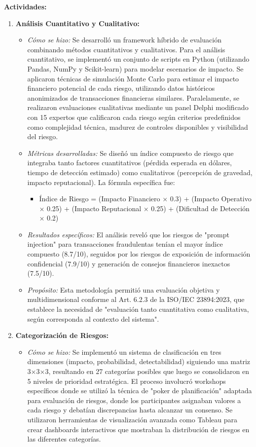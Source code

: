 \documentclass[12pt]{article}
\begin{document}
\textbf{Actividades:}
\begin{enumerate}
    \item \textbf{Análisis Cuantitativo y Cualitativo:}
        \begin{itemize}
            \item \textit{Cómo se hizo:} Se desarrolló un framework híbrido de evaluación combinando métodos cuantitativos y cualitativos. Para el análisis cuantitativo, se implementó un conjunto de scripts en Python (utilizando Pandas, NumPy y Scikit-learn) para modelar escenarios de impacto. Se aplicaron técnicas de simulación Monte Carlo para estimar el impacto financiero potencial de cada riesgo, utilizando datos históricos anonimizados de transacciones financieras similares. Paralelamente, se realizaron evaluaciones cualitativas mediante un panel Delphi modificado con 15 expertos que calificaron cada riesgo según criterios predefinidos como complejidad técnica, madurez de controles disponibles y visibilidad del riesgo.
            \item \textit{Métricas desarrolladas:} Se diseñó un índice compuesto de riesgo que integraba tanto factores cuantitativos (pérdida esperada en dólares, tiempo de detección estimado) como cualitativos (percepción de gravedad, impacto reputacional). La fórmula específica fue:
              \begin{itemize}
                \item Índice de Riesgo = (Impacto Financiero × 0.3) + (Impacto Operativo × 0.25) + (Impacto Reputacional × 0.25) + (Dificultad de Detección × 0.2)
              \end{itemize}
            \item \textit{Resultados específicos:} El análisis reveló que los riesgos de "prompt injection" para transacciones fraudulentas tenían el mayor índice compuesto (8.7/10), seguidos por los riesgos de exposición de información confidencial (7.9/10) y generación de consejos financieros inexactos (7.5/10).
            \item \textit{Propósito:} Esta metodología permitió una evaluación objetiva y multidimensional conforme al Art. 6.2.3 de la ISO/IEC 23894:2023, que establece la necesidad de "evaluación tanto cuantitativa como cualitativa, según corresponda al contexto del sistema".
        \end{itemize}
    \item \textbf{Categorización de Riesgos:}
        \begin{itemize}
            \item \textit{Cómo se hizo:} Se implementó un sistema de clasificación en tres dimensiones (impacto, probabilidad, detectabilidad) siguiendo una matriz 3×3×3, resultando en 27 categorías posibles que luego se consolidaron en 5 niveles de prioridad estratégica. El proceso involucró workshops específicos donde se utilizó la técnica de "poker de planificación" adaptada para evaluación de riesgos, donde los participantes asignaban valores a cada riesgo y debatían discrepancias hasta alcanzar un consenso. Se utilizaron herramientas de visualización avanzada como Tableau para crear dashboards interactivos que mostraban la distribución de riesgos en las diferentes categorías.

\end{itemize}
\end{enumerate}
\end{document}

